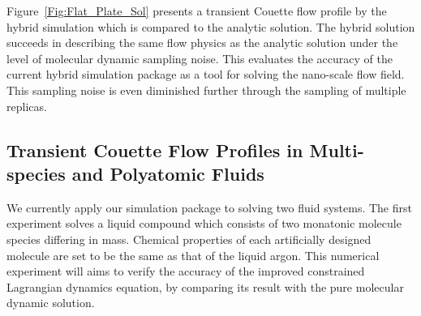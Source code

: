 \documentclass[]{aiaa-tc}%
\begin{document}
Figure~\ref{Fig:Flat_Plate_Sol} presents a transient Couette flow profile 
by the hybrid simulation which is compared to the analytic solution. 
The hybrid solution succeeds in describing the same flow physics as the 
analytic solution under the level of molecular dynamic sampling noise.
This evaluates the accuracy of the current hybrid simulation package
as a tool for solving the nano-scale flow field. This sampling noise is 
even diminished further through the sampling of multiple replicas.\cite{JoCS2012}






\subsection{Transient Couette Flow Profiles in Multi-species and Polyatomic Fluids}
\label{sec:result_multi}

We currently apply our simulation package to solving two fluid systems.
The first experiment solves a liquid compound which consists of two
monatonic molecule species differing in mass. Chemical properties of
each artificially designed molecule are set to be the same as that of
the liquid argon. This numerical experiment will aims to verify the
accuracy of the improved constrained Lagrangian dynamics equation, by comparing its result with the pure molecular dynamic solution.
\end{document}
